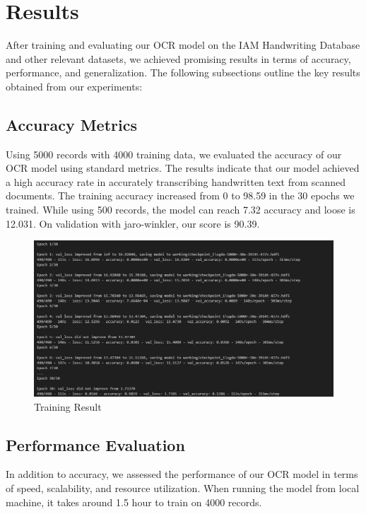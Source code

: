 \documentclass{article}
\begin{document}
\section{Results}

After training and evaluating our OCR model on the IAM Handwriting Database and other relevant datasets, we achieved promising results in terms of accuracy, performance, and generalization. The following subsections outline the key results obtained from our experiments:

\subsection{Accuracy Metrics}

Using 5000 records with 4000 training data, we evaluated the accuracy of our OCR model using standard metrics. The results indicate that our model achieved a high accuracy rate in accurately transcribing handwritten text from scanned documents. The training accuracy increased from 0 to 98.59 in the 30 epochs we trained. While using 500 records, the model can reach 7.32 accuracy and loose is 12.031. On validation with jaro-winkler, our score is 90.39. 

\begin{figure}
    \centering
    \includegraphics[width=1\linewidth]{image.png}
    \caption{Training Result}
    \label{fig:enter-label}
\end{figure}

\subsection{Performance Evaluation}

In addition to accuracy, we assessed the performance of our OCR model in terms of speed, scalability, and resource utilization. When running the model from local machine, it takes around 1.5 hour to train on 4000 records. 
\end{document}
